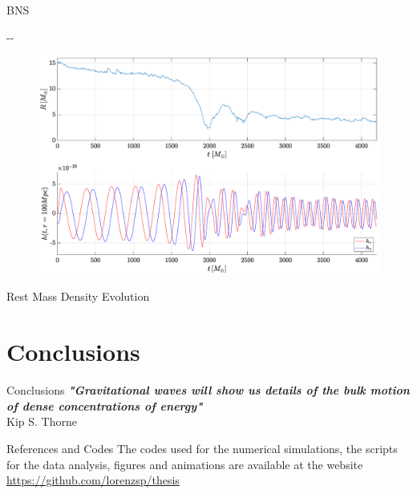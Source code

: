\documentclass{beamer}
\newlength{\offsetpage}
\newenvironment{widepage}{\begin{adjustwidth}{-\offsetpage}{-\offsetpage}%
    \addtolength{\textwidth}{2\offsetpage}}%
{\end{adjustwidth}}
\theoremstyle{definition}
\theoremstyle{plain}
\begin{document}
\begin{frame}{BNS}
\begin{widepage}
\begin{figure}
    \centering
    \includegraphics[scale=0.3,width=1\textwidth]{bns.eps}
    \end{figure}
    \end{widepage}
\end{frame}

\begin{frame}{Rest Mass Density Evolution}
\begin{figure}
    \centering
    \end{figure}
\end{frame}

\section{Conclusions}
\begin{frame}{Conclusions}
\emph{\textbf{"Gravitational
waves will show us details of the bulk motion of
dense concentrations of energy"}}\\
\vspace{0.2cm} Kip S. Thorne
\begin{figure}
    \centering
    \end{figure}
\end{frame}

\begin{frame}{References and Codes}
The codes used for the numerical simulations, the scripts for the data analysis, figures and animations are available at the website\\
\vspace{0.5cm}
\url{https://github.com/lorenzsp/thesis}

\end{frame}
\end{document}
